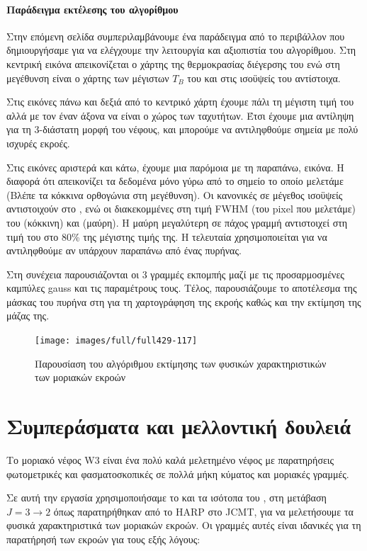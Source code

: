 \documentclass[a4paper,12pt]{memoir}
\begin{document}
\subsubsection{Παράδειγμα εκτέλεσης του αλγορίθμου}
Στην επόμενη σελίδα συμπεριλαμβάνουμε ένα παράδειγμα από το περιβάλλον που δημιουργήσαμε για να ελέγχουμε την λειτουργία και αξιοπιστία του αλγορίθμου. Στη κεντρική εικόνα απεικονίζεται ο χάρτης της θερμοκρασίας διέγερσης του 
ενώ στη μεγέθυνση είναι ο χάρτης των μέγιστων $T_B$ του  και στις ισοϋψείς του  αντίστοιχα.

Στις εικόνες πάνω και δεξιά από το κεντρικό χάρτη έχουμε πάλι τη μέγιστη τιμή του  αλλά με τον έναν άξονα να είναι ο χώρος των ταχυτήτων. Έτσι έχουμε μια αντίληψη για τη 3-διάστατη μορφή του νέφους, και μπορούμε να αντιληφθούμε σημεία με πολύ ισχυρές εκροές.

Στις εικόνες αριστερά και κάτω, έχουμε μια παρόμοια με τη παραπάνω, εικόνα. Η διαφορά ότι απεικονίζει τα δεδομένα μόνο γύρω από το σημείο το οποίο μελετάμε (Βλέπε τα κόκκινα ορθογώνια στη μεγέθυνση). Οι κανονικές σε μέγεθος ισοϋψείς αντιστοιχούν στο , ενώ οι διακεκομμένες στη τιμή FWHM (του pixel που μελετάμε) του  (κόκκινη) και  (μαύρη). Η μαύρη μεγαλύτερη σε πάχος γραμμή αντιστοιχεί στη τιμή του  στο 80\% της μέγιστης τιμής της. Η τελευταία χρησιμοποιείται για να αντιληφθούμε αν υπάρχουν παραπάνω από ένας πυρήνας. 

Στη συνέχεια παρουσιάζονται οι 3 γραμμές εκπομπής μαζί με τις προσαρμοσμένες καμπύλες gauss και τις παραμέτρους τους. Τέλος, παρουσιάζουμε το αποτέλεσμα της μάσκας του πυρήνα στη  για τη χαρτογράφηση της εκροής καθώς και την εκτίμηση της μάζας της.

\begin{figure}[h]
	\centering
	\texttt{[image: images/full/full429-117]}
	\caption{Παρουσίαση του αλγόριθμου εκτίμησης των φυσικών χαρακτηριστικών των μοριακών εκροών}
\end{figure}

\chapter{Συμπεράσματα και μελλοντική δουλειά}
Το μοριακό νέφος W3 είναι ένα πολύ καλά μελετημένο νέφος με παρατηρήσεις φωτομετρικές και φασματοσκοπικές σε πολλά μήκη κύματος και μοριακές γραμμές. 

Σε αυτή την εργασία χρησιμοποιήσαμε το  και τα ισότοπα του ,  στη μετάβαση $J=3\to 2$ όπως παρατηρήθηκαν από το HARP στο JCMT, για να μελετήσουμε τα φυσικά χαρακτηριστικά των μοριακών εκροών. Οι γραμμές αυτές είναι ιδανικές για τη παρατήρησή των εκροών για τους εξής λόγους:
\end{document}
